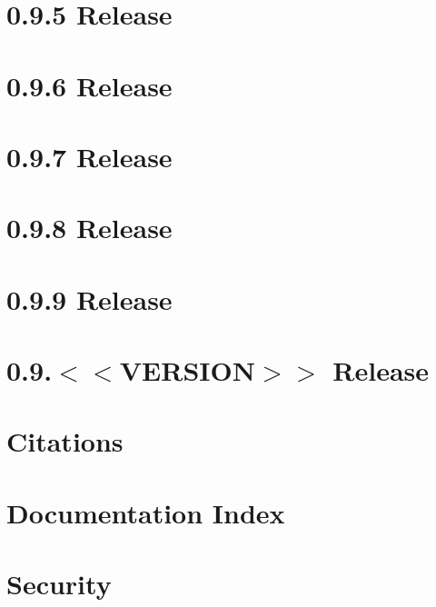 \let\mypdfximage\pdfximage\def\pdfximage{\immediate\mypdfximage}\documentclass[twoside]{book}
\newcommand{\+}{\discretionary{\mbox{\scriptsize$\hookleftarrow$}}{}{}}
\begin{document}
\chapter{0.9.5 Release}
\label{doc_news_2021-04-12_0_9_5_md}

\chapter{0.9.6 Release}
\label{doc_news_2021-06-07_0_9_6_md}

\chapter{0.9.7 Release}
\label{doc_news_2021-07-09_0_9_7_md}

\chapter{0.9.8 Release}
\label{doc_news_2021-10-04_0_9_8_md}

\chapter{0.9.9 Release}
\label{doc_news_2022-03-10_0_9_9_md}

\chapter{0.9.$<$$<$VERSION$>$$>$ Release}
\label{doc_news__preparation_next_release_md}

\chapter{Citations}
\label{doc_paper_README_md}

\chapter{Documentation Index}
\label{doc_README_md}

\chapter{Security}
\label{doc_SECURITY_md}

\end{document}

